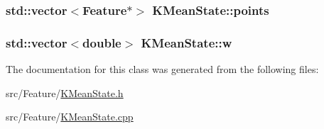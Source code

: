 \hypertarget{class_k_mean_state_a19246d646907634855260eb8e14d3def}{
\subsubsection[{points}]{\setlength{\rightskip}{0pt plus 5cm}std\+::vector$<${\bf Feature}$\ast$$>$ K\+Mean\+State\+::points\hspace{0.3cm}{\ttfamily [private]}}}\label{class_k_mean_state_a19246d646907634855260eb8e14d3def}
\hypertarget{class_k_mean_state_a95902b6cdda265f947056de535ba18b0}{
\subsubsection[{w}]{\setlength{\rightskip}{0pt plus 5cm}std\+::vector$<$double$>$ K\+Mean\+State\+::w\hspace{0.3cm}{\ttfamily [private]}}}\label{class_k_mean_state_a95902b6cdda265f947056de535ba18b0}


The documentation for this class was generated from the following files\+:\begin{DoxyCompactItemize}
\item 
src/\+Feature/\hyperlink{_k_mean_state_8h}{K\+Mean\+State.\+h}\item 
src/\+Feature/\hyperlink{_k_mean_state_8cpp}{K\+Mean\+State.\+cpp}\end{DoxyCompactItemize}
